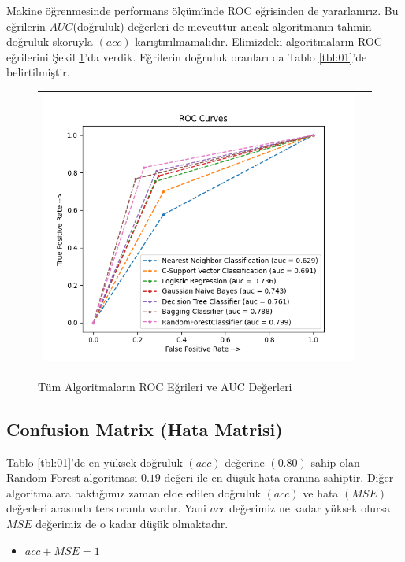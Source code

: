\documentclass[conference]{IEEEtran}
\begin{document}
\quad Makine öğrenmesinde performans ölçümünde ROC eğrisinden de yararlanırız. Bu eğrilerin $AUC$(doğruluk) değerleri de mevcuttur ancak algoritmanın tahmin doğruluk skoruyla $(acc)$ karıştırılmamalıdır\cite{22}. Elimizdeki algoritmaların ROC eğrilerini Şekil \ref{fig:16}'da verdik. Eğrilerin doğruluk oranları da Tablo \ref{tbl:01}'de belirtilmiştir.

\begin{figure}[!h]
	\centering
	\begin{center}
		\begin{tabular}{cc}
			\includegraphics[scale=0.575]{pictures/pic_16.png}&
		\end{tabular}
	\end{center}
	\caption{Tüm Algoritmaların ROC Eğrileri ve AUC Değerleri}
	\label{fig:16}
\end{figure}

\subsection{\textbf{Confusion Matrix (Hata Matrisi)}}

\quad Tablo \ref{tbl:01}'de en yüksek doğruluk $(acc)$ değerine $(0.80)$ sahip olan Random Forest algoritması $0.19$ değeri ile en düşük hata oranına sahiptir. Diğer algoritmalara baktığımız zaman elde edilen doğruluk $(acc)$ ve hata $(MSE)$ değerleri arasında ters orantı vardır. Yani $acc$ değerimiz ne kadar yüksek olursa $MSE$ değerimiz de o kadar düşük olmaktadır.
\begin{itemize}
\item $acc + MSE = 1$
\end{itemize}
\end{document}
